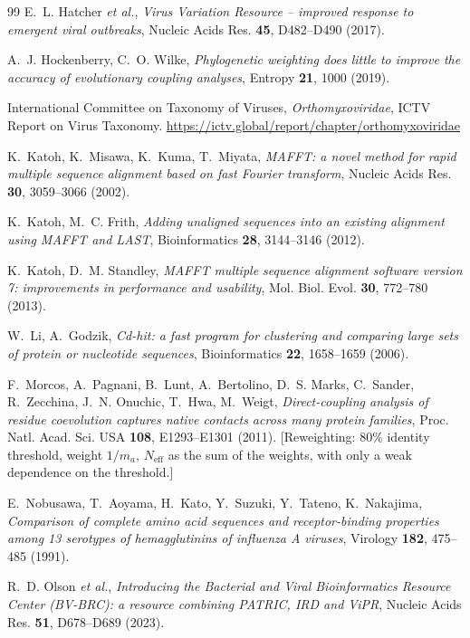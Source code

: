 \documentclass[11pt,a4paper]{article}
\newcommand{\Neff}{N_{\mathrm{eff}}}
\begin{document}
\begin{thebibliography}{99}
 E.~L. Hatcher \emph{et al.},
  \emph{Virus Variation Resource -- improved response to emergent viral
  outbreaks}, Nucleic Acids Res. \textbf{45}, D482--D490 (2017).

 A.~J. Hockenberry, C.~O. Wilke,
  \emph{Phylogenetic weighting does little to improve the accuracy of
  evolutionary coupling analyses}, Entropy \textbf{21}, 1000 (2019).

 International Committee on Taxonomy of Viruses,
  \emph{Orthomyxoviridae}, ICTV Report on Virus Taxonomy.
  \url{https://ictv.global/report/chapter/orthomyxoviridae}

 K.~Katoh, K.~Misawa, K.~Kuma, T.~Miyata,
  \emph{MAFFT: a novel method for rapid multiple sequence alignment based on
  fast Fourier transform}, Nucleic Acids Res. \textbf{30}, 3059--3066 (2002).

 K.~Katoh, M.~C. Frith,
  \emph{Adding unaligned sequences into an existing alignment using MAFFT and
  LAST}, Bioinformatics \textbf{28}, 3144--3146 (2012).

 K.~Katoh, D.~M. Standley,
  \emph{MAFFT multiple sequence alignment software version 7: improvements in
  performance and usability}, Mol. Biol. Evol. \textbf{30}, 772--780 (2013).

 W.~Li, A.~Godzik,
  \emph{Cd-hit: a fast program for clustering and comparing large sets of
  protein or nucleotide sequences}, Bioinformatics \textbf{22}, 1658--1659
  (2006).

 F.~Morcos, A.~Pagnani, B.~Lunt, A.~Bertolino,
  D.~S. Marks, C.~Sander, R.~Zecchina, J.~N. Onuchic, T.~Hwa, M.~Weigt,
  \emph{Direct-coupling analysis of residue coevolution captures native contacts
  across many protein families}, Proc. Natl. Acad. Sci. USA \textbf{108},
  E1293--E1301 (2011).
  [Reweighting: 80\% identity threshold, weight $1/m_a$, $\Neff$ as the sum of
  the weights, with only a weak dependence on the threshold.]

 E.~Nobusawa, T.~Aoyama, H.~Kato, Y.~Suzuki,
  Y.~Tateno, K.~Nakajima,
  \emph{Comparison of complete amino acid sequences and receptor-binding
  properties among 13 serotypes of hemagglutinins of influenza A viruses},
  Virology \textbf{182}, 475--485 (1991).

 R.~D. Olson \emph{et al.},
  \emph{Introducing the Bacterial and Viral Bioinformatics Resource Center
  (BV-BRC): a resource combining PATRIC, IRD and ViPR}, Nucleic Acids Res.
  \textbf{51}, D678--D689 (2023).


\end{thebibliography}
\end{document}
